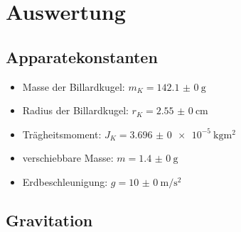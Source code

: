 \section{Auswertung}

\subsection{Apparatekonstanten}

\begin{itemize}
  \item Masse der Billardkugel: $m_K = \SI{142,1(0)}{\g}$
  \item Radius der Billardkugel: $r_K = \SI{2,55(0)}{\cm}$
  \item Trägheitsmoment: $J_K = \SI{3,696(0)e-5}{\kg\m^2}$
  \item verschiebbare Masse: $m = \SI{1,4(0)}{\g}$
  \item Erdbeschleunigung: $g = \SI{10(0)}{\meter \per \square \second}$
\end{itemize}

\subsection{Gravitation}

